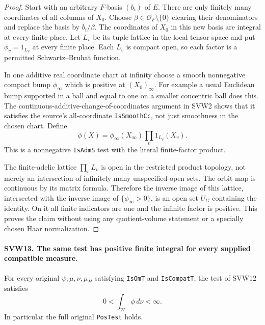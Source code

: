 \begin{proof}
Start with an arbitrary $F$-basis $(b_i)$ of $E$.  There are only
finitely many coordinates of all columns of $X_0$.  Choose
$\beta\in\mathcal O_F\setminus\{0\}$ clearing their denominators
and replace the basis by $b_i/\beta$.  The coordinates of $X_0$
in this new basis are integral at every finite place.  Let $L_v$
be its tuple lattice in the local tensor space and put
$\phi_v=1_{L_v}$ at every finite place.  Each $L_v$ is compact
open, so each factor is a permitted Schwartz--Bruhat function.

In one additive real coordinate chart at infinity choose a smooth
nonnegative compact bump $\phi_\infty$ which is positive at
$(X_0)_\infty$.  For example a usual Euclidean bump supported in
a ball and equal to one on a smaller concentric ball does this.
The continuous-additive-change-of-coordinates argument in SVW2
shows that it satisfies the source's all-coordinate
\texttt{IsSmoothCc}, not just smoothness in the chosen chart.
Define
\[
                  \phi(X)=\phi_\infty(X_\infty)
                                      \prod_v1_{L_v}(X_v).
 \tag{SVW.26}
\]
This is a nonnegative \texttt{IsAdmS} test with the literal
finite-factor product.

The finite-adelic lattice $\prod_v L_v$ is open in the restricted
product topology, not merely an intersection of infinitely many
unspecified open sets.  The orbit map is continuous by its matrix
formula.  Therefore the inverse image of this lattice, intersected
with the inverse image of $\{\phi_\infty>0\}$, is an open set
$U_G$ containing the identity.  On it all finite indicators are
one and the infinite factor is positive.  This proves the claim
without using any quotient-volume statement or a specially chosen
Haar normalization.
\end{proof}

\paragraph{SVW13. The same test has positive finite integral for every supplied compatible measure.}
\label{claim:SVW13}
For every original $\psi,\mu,\nu,\mu_H$ satisfying
\texttt{IsOmT} and \texttt{IsCompatT}, the test of SVW12 satisfies
\[
                         0<\int_W\phi\,d\nu<\infty.
 \tag{SVW.27}
\]
In particular the full original \texttt{PosTest} holds.

